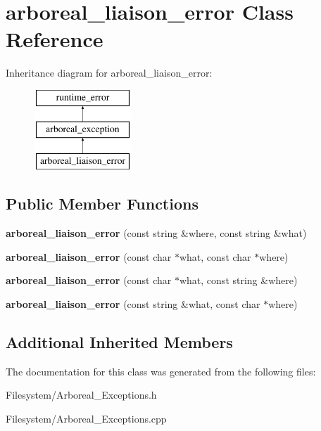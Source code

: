 \hypertarget{classarboreal__liaison__error}{}\section{arboreal\+\_\+liaison\+\_\+error Class Reference}
\label{classarboreal__liaison__error}
Inheritance diagram for arboreal\+\_\+liaison\+\_\+error\+:\begin{figure}[H]
\begin{center}
\leavevmode
\includegraphics[height=3.000000cm]{classarboreal__liaison__error}
\end{center}
\end{figure}
\subsection*{Public Member Functions}
\begin{DoxyCompactItemize}
\item 
\mbox{\label{classarboreal__liaison__error_a0847e2be1ec77afd8775c916ab2fec39}} 
{\bfseries arboreal\+\_\+liaison\+\_\+error} (const string \&where, const string \&what)
\item 
\mbox{\label{classarboreal__liaison__error_a11a287bfe6b8113deae8f6dcb3d036ad}} 
{\bfseries arboreal\+\_\+liaison\+\_\+error} (const char $\ast$what, const char $\ast$where)
\item 
\mbox{\label{classarboreal__liaison__error_ae5aa5a68f9f41201ca632bb112488b47}} 
{\bfseries arboreal\+\_\+liaison\+\_\+error} (const char $\ast$what, const string \&where)
\item 
\mbox{\label{classarboreal__liaison__error_a396e497aeebc65d16da10470826e530b}} 
{\bfseries arboreal\+\_\+liaison\+\_\+error} (const string \&what, const char $\ast$where)
\end{DoxyCompactItemize}
\subsection*{Additional Inherited Members}


The documentation for this class was generated from the following files\+:\begin{DoxyCompactItemize}
\item 
Filesystem/Arboreal\+\_\+\+Exceptions.\+h\item 
Filesystem/Arboreal\+\_\+\+Exceptions.\+cpp\end{DoxyCompactItemize}
